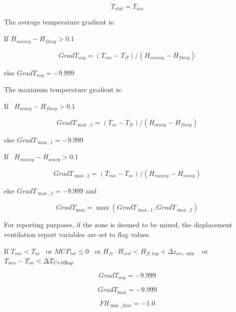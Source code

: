 \begin{equation}
{T_{stat}} = {T_{mx}}
\end{equation}

The average temperature gradient is:

If \({H_{mxavg}} - {H_{flavg}} > 0.1\)

\begin{equation}
Grad{T_{avg}} = ({T_{mx}} - {T_{fl}})/({H_{mxavg}} - {H_{flavg}})
\end{equation}

else \(Grad{T_{avg}} =  - 9.999\)

The maximum temperature gradient is:

If~ \({H_{ocavg}} - {H_{flavg}} > 0.1\)

\begin{equation}
Grad{T_{\max ,1}} = ({T_{oc}} - {T_{fl}})/({H_{ocavg}} - {H_{flavg}})
\end{equation}

else \(Grad{T_{\max ,1}} = - 9.999\)

If~ \({H_{mxavg}} - {H_{ocavg}} > 0.1\)

\begin{equation}
Grad{T_{\max ,2}} = ({T_{mx}} - {T_{oc}})/({H_{mxavg}} - {H_{ocavg}})
\end{equation}

else \(Grad{T_{\max ,2}} = - 9.999\) and

\begin{equation}
Grad{T_{\max }} = \max (Grad{T_{\max ,1}},Grad{T_{\max ,2}})
\end{equation}

For reporting purposes, if the zone is deemed to be mixed, the displacement ventilation report variables are set to flag values.

If \({T_{mx}} < {T_{oc}}\) ~or \(MC{P_{tot}} \le 0\) ~or \({H_{fr}} \cdot {H_{ceil}} < {H_{fl,top}} + \Delta {z_{occ,\min }}\) ~or \({T_{mx}} - {T_{oc}} < \Delta {T_{Crit{\mathop{\rm Re}\nolimits} p}}\)

\begin{equation}
Grad{T_{avg}} =  - 9.999
\end{equation}

\begin{equation}
Grad{T_{\max }} =  - 9.999
\end{equation}

\begin{equation}
F{R_{\min ,flow}} =  - 1.0
\end{equation}

